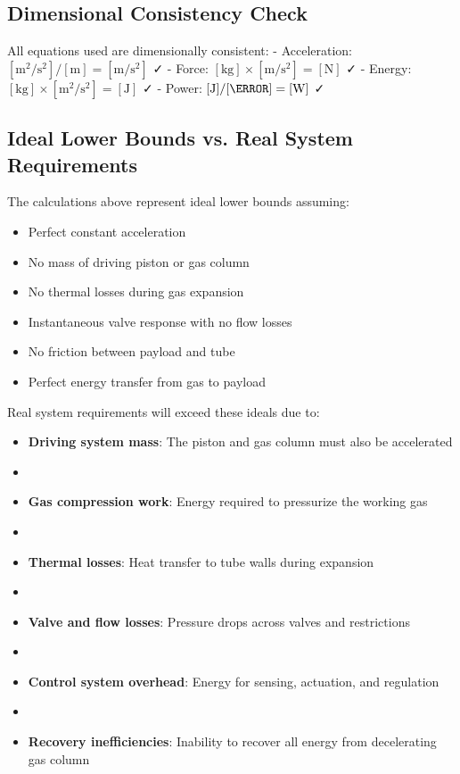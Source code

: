 \documentclass[12pt]{article}
\begin{document}
\begin{itemize}
\subsection{Dimensional Consistency Check}
All equations used are dimensionally consistent:
- Acceleration: $[\text{m}^2/\text{s}^2] / [\text{m}] = [\text{m}/\text{s}^2]$ ✓
- Force: $[\text{kg}] \times [\text{m}/\text{s}^2] = [\text{N}]$ ✓
- Energy: $[\text{kg}] \times [\text{m}^2/\text{s}^2] = [\text{J}]$ ✓
- Power: $[\text{J}] / [\s] = [\text{W}]$ ✓

\subsection{Ideal Lower Bounds vs. Real System Requirements}
The calculations above represent ideal lower bounds assuming:
\begin{itemize}
    \item Perfect constant acceleration
    \item No mass of driving piston or gas column
    \item No thermal losses during gas expansion
    \item Instantaneous valve response with no flow losses
    \item No friction between payload and tube
    \item Perfect energy transfer from gas to payload
\end{itemize}

Real system requirements will exceed these ideals due to:
\begin{itemize}
    \item \textbf{Driving system mass}: The piston and gas column must also be accelerated
    \item \item \textbf{Gas compression work}: Energy required to pressurize the working gas
    \item \item \textbf{Thermal losses}: Heat transfer to tube walls during expansion
    \item \item \textbf{Valve and flow losses}: Pressure drops across valves and restrictions
    \item \item \textbf{Control system overhead}: Energy for sensing, actuation, and regulation
    \item \item \textbf{Recovery inefficiencies}: Inability to recover all energy from decelerating gas column
\end{itemize}


\end{itemize}
\end{document}
